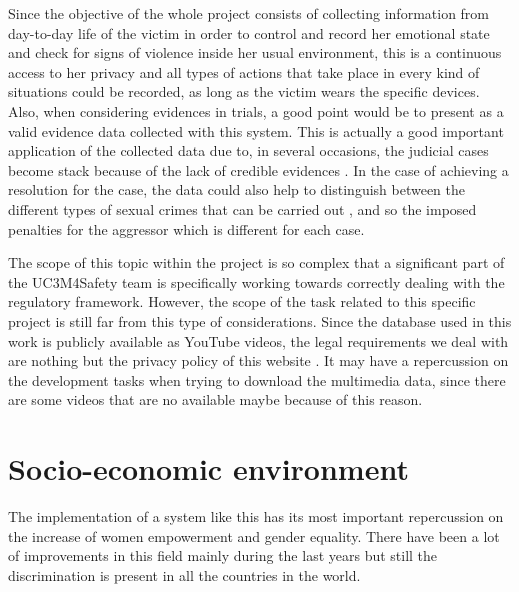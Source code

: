 	Since the objective of the whole project consists of collecting information from day-to-day life of the victim in order to control and record her emotional state and check for signs of violence inside her usual environment, this is a continuous access to her privacy and all types of actions that take place in every kind of situations could be recorded, as long as the victim wears the specific devices. Also, when considering evidences in trials, a good point would be to present as a valid evidence data collected with this system. This is actually a good important application of the collected data due to, in several occasions, the judicial cases become stack because of the lack of credible evidences \cite{UC3M4SafetyTeam2018}. In the case of achieving a resolution for the case, the data could also help to distinguish between the different types of sexual crimes that can be carried out \cite{Baldwin}, and so the imposed penalties for the aggressor which is different for each case.
	
	The scope of this topic within the project is so complex that a significant part of the UC3M4Safety team is specifically working towards correctly dealing with the regulatory framework. %
	However, the scope of the task related to this specific project is still far from this type of considerations. Since the database used in this work is publicly available as YouTube videos, the legal requirements we deal with are nothing but the privacy policy of this website \cite{Goetzparterns}. It may have a repercussion on the development tasks when trying to download the multimedia data, since there are some videos that are no available maybe because of this reason. 

\section{Socio-economic environment}
	
	The implementation of a system like this has its most important repercussion on the increase of women empowerment and gender equality. There have been a lot of improvements in this field mainly during the last years but still the discrimination is present in all the countries in the world. 
	
